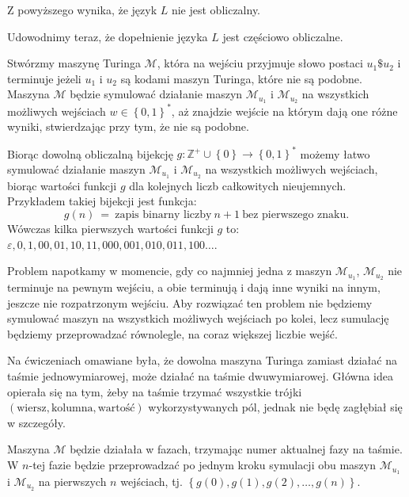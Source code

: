 \documentclass[12pt]{article}
\begin{document}
	\medskip
	
	Z powyższego wynika, że język \(L\) nie jest obliczalny.
	
	\bigskip
	
	Udowodnimy teraz, że dopełnienie języka \(L\) jest częściowo obliczalne.
	
	\medskip
	
	Stwórzmy maszynę Turinga \(\mathcal{M}\), która na wejściu przyjmuje słowo
	postaci \(u_{1} \$ u_{2}\) i terminuje jeżeli \(u_{1}\) i \(u_{2}\) są
	kodami maszyn Turinga, które nie są podobne. Maszyna \(\mathcal{M}\) będzie
	symulować działanie maszyn \(\mathcal{M}_{u_{1}}\) i \(\mathcal{M}_{u_{2}}\)
	na wszystkich możliwych wejściach \(w \in \left\{ 0, 1 \right\} ^ {\ast}\),
	aż znajdzie wejście na którym dają one różne wyniki, stwierdzając przy tym,
	że nie są podobne.
	
	\medskip
	
	Biorąc dowolną obliczalną bijekcję \(g : \mathbb{Z}^{+} \cup \left\{ 0
	\right\} \rightarrow \left\{ 0, 1 \right\} ^ {\ast}\) możemy łatwo symulować
	działanie maszyn \(\mathcal{M}_{u_{1}}\) i \(\mathcal{M}_{u_{2}}\) na
	wszystkich możliwych wejściach, biorąc wartości funkcji \(g\) dla kolejnych
	liczb całkowitych nieujemnych. Przykładem takiej bijekcji jest funkcja:
	\[ g \left( n \right) \ = \ \text{zapis binarny liczby} \ n + 1 \ \text{bez
	pierwszego znaku.} \]
	Wówczas kilka pierwszych wartości funkcji \(g\) to: \(\varepsilon, 0, 1, 00,
	01, 10, 11, 000, 001, 010, 011, 100 \ldots\).
	
	\medskip
	
	Problem napotkamy w momencie, gdy co najmniej jedna z maszyn
	\(\mathcal{M}_{u_{1}}\), \(\mathcal{M}_{u_{2}}\) nie terminuje na pewnym
	wejściu, a obie terminują i dają inne wyniki na innym, jeszcze nie
	rozpatrzonym wejściu. Aby rozwiązać ten problem nie będziemy symulować
	maszyn na wszystkich możliwych wejściach po kolei, lecz sumulację będziemy
	przeprowadzać równolegle, na coraz większej liczbie wejść.
	
	\medskip
	
	Na ćwiczeniach omawiane była, że dowolna maszyna Turinga zamiast działać na
	taśmie jednowymiarowej, może działać na taśmie dwuwymiarowej. Główna idea
	opierała się na tym, żeby na taśmie trzymać wszystkie trójki \(\left(
	\text{wiersz}, \text{kolumna}, \text{wartość} \right)\) wykorzystywanych
	pól, jednak nie będę zagłębiał się w szczegóły.
	
	\medskip
	
	Maszyna \(\mathcal{M}\) będzie działała w fazach, trzymając numer aktualnej
	fazy na taśmie. W \(n\)-tej fazie będzie przeprowadzać po jednym kroku
	symulacji obu maszyn \(\mathcal{M}_{u_{1}}\) i \(\mathcal{M}_{u_{2}}\)
	na pierwszych \(n\) wejściach, tj. \(\left\{ g \left( 0 \right), g \left( 1
	\right), g \left( 2 \right), \ldots, g \left( n \right) \right\}\).
	
\end{document}
